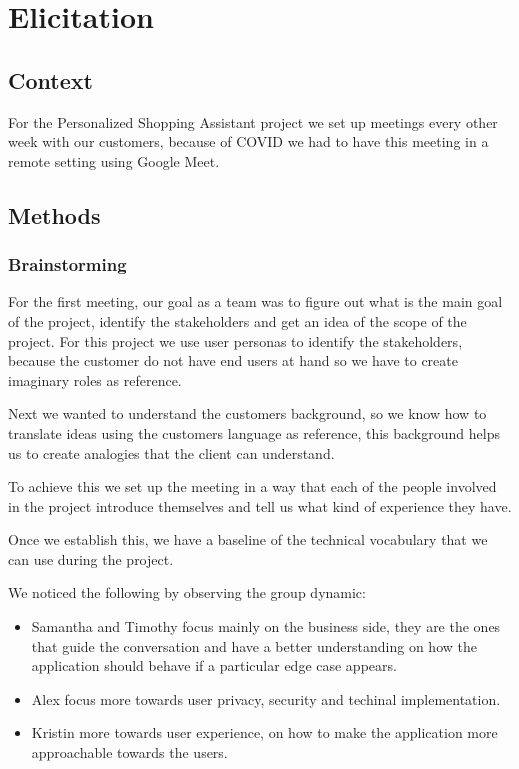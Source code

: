 \section{Elicitation}
\subsection{Context}
For the Personalized Shopping Assistant project we set up meetings every other 
week with our customers, because of COVID we had to have this meeting in a 
remote setting using Google Meet.

\subsection{Methods}
\subsubsection{Brainstorming}
For the first meeting, our goal as a team was to figure out what is the main 
goal of the project, identify the stakeholders and get an idea of the scope of 
the project. For this project we use user personas \cite{user_personas} 
to identify the stakeholders, because the customer do not have end users at 
hand so we have to create imaginary roles as reference. \newline

\noindent Next we wanted to understand the customers background, so we know 
how to translate ideas using the customers language as reference, this 
background helps us to create analogies that the client can understand. \newline

\noindent To achieve this we set up the meeting in a way that each of the 
people involved in the project introduce themselves and tell us what kind of 
experience they have. \newline

\noindent Once we establish this, we have a baseline of the technical 
vocabulary that we can use during the project. \newline

\noindent We noticed the following by observing the group dynamic:
\begin{itemize}
    \item Samantha and Timothy focus mainly on the business side, they are 
    the ones that guide the conversation and have a better understanding 
    on how the application should behave if a particular edge case appears.
    \item Alex focus more towards user privacy, security and techinal 
    implementation.
    \item Kristin more towards user experience, on how to make the application 
    more approachable towards the users.
\end{itemize}

